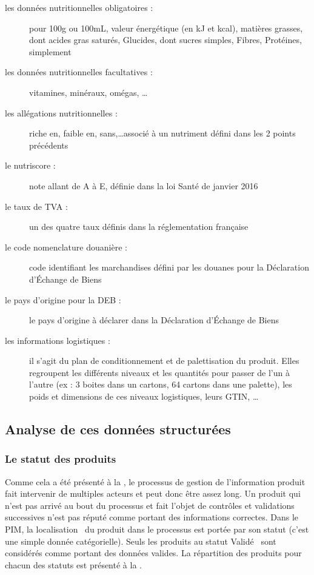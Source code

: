 \begin{description}
            \item[les données nutritionnelles obligatoires :] pour 100g ou 100mL, valeur énergétique (en kJ et kcal), matières grasses, dont acides gras saturés, Glucides, dont sucres simples, Fibres, Protéines, simplement
            \item[les données nutritionnelles facultatives :] vitamines, minéraux, omégas, \dots
            \item[les allégations nutritionnelles :] riche en, faible en, sans,\dots associé à un nutriment défini dans les 2 points précédents
            \item[le nutriscore :] note allant de A à E, définie dans la loi Santé de janvier 2016
            \item[le taux de TVA :] un des quatre taux définis dans la réglementation française
            \item[le code nomenclature douanière :] code identifiant les marchandises défini par les douanes pour la Déclaration d'\'{E}change de Biens~\cite{notions_DEB}
            \item[le pays d'origine pour la DEB :] le pays d'origine à déclarer dans la Déclaration d'\'{E}change de Biens~\cite{notions_DEB}
            \item[les informations logistiques :] il s'agit du plan de conditionnement et de palettisation du produit. Elles regroupent les différents niveaux et les quantités pour passer de l'un à l'autre (ex : 3 boites dans un cartons, 64 cartons dans une palette), les poids et dimensions de ces niveaux logistiques, leurs GTIN, \dots
        \end{description}
        
            \subsection{Analyse de ces données structurées}

                \subsubsection{Le statut des produits}
                Comme cela a été présenté à la , le processus de gestion de l'information produit fait intervenir de multiples acteurs et peut donc être assez long.
                Un produit qui n'est pas arrivé au bout du processus et fait l'objet de contrôles et validations successives n'est pas réputé comme portant des informations correctes.
                Dans le PIM, la \og localisation \fg~du produit dans le processus est portée par son statut (c'est une simple donnée catégorielle).
                Seuls les produits au statut \og Validé \fg~sont considérés comme portant des données valides.
                La répartition des produits pour chacun des statuts est présenté à la .

